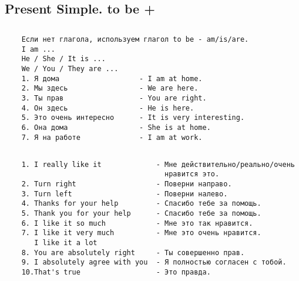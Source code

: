 \subsection{Present Simple. to be +}
\subsection*{}
\begin{verbatim}
    Если нет глагола, используем глагол to be - am/is/are.
    I am ...
    He / She / It is ...
    We / You / They are ...
    1. Я дома                   - I am at home.
    2. Мы здесь                 - We are here.
    3. Ты прав                  - You are right.
    4. Он здесь                 - He is here.
    5. Это очень интересно      - It is very interesting.
    6. Она дома                 - She is at home.
    7. Я на работе              - I am at work.
\end{verbatim}

\subsection*{}
\begin{verbatim}
    1. I really like it             - Мне действительно/реально/очень 
                                      нравится это.
    2. Turn right                   - Поверни направо.
    3. Turn left                    - Поверни налево.
    4. Thanks for your help         - Спасибо тебе за помощь.
    5. Thank you for your help      - Спасибо тебе за помощь.
    6. I like it so much            - Мне это так нравится.
    7. I like it very much          - Мне это очень нравится.
       I like it a lot
    8. You are absolutely right     - Ты совершенно прав.
    9. I absolutely agree with you  - Я полностью согласен с тобой.
    10.That's true                  - Это правда.
\end{verbatim}

